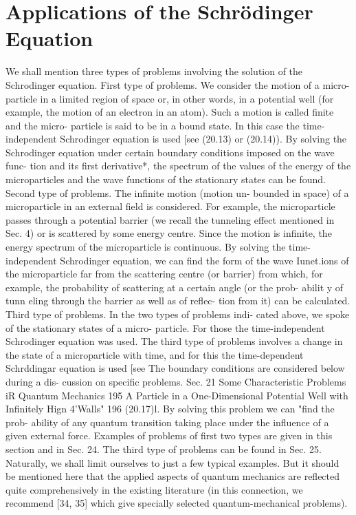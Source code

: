 \documentclass[a4paper,sfsidenotes,colorlinks=true]{tufte-book}
\numberwithin{equation}{section}
\numberwithin{figure}{section}
\begin{document}
{{\section{Applications of the Schr\"odinger Equation}
We shall mention three types of problems involving the solution of the Schrodinger equation. First type of problems. We consider the motion of a micro- particle in a limited region of space or, in other words, in a potential well (for example, the motion of an electron in an atom). Such a motion is called finite and the micro- particle is said to be in a bound state. In this case the time-independent Schrodinger equation is used [see (20.13) or (20.14)). By solving the Schrodinger equation under certain boundary conditions imposed on the wave func- tion and its first derivative*, the spectrum of the values of the energy of the microparticles and the wave functions of the stationary states can be found.
Second type of problems. The infinite motion (motion un- bounded in space) of a microparticle in an external field is considered. For example, the microparticle passes through a potential barrier (we recall the tunneling effect mentioned in Sec. 4) or is scattered by some energy centre. Since the motion is infinite, the energy spectrum of the microparticle is continuous. By solving the time- independent Schrodinger equation, we can find the form of the wave Iunet.ions of the microparticle far from the scattering centre (or barrier) from which, for example, the probability of scattering at a certain angle (or the prob- abilit y of tunn eling through the barrier as well as of reflec- tion from it) can be calculated.
Third type of problems. In the two types of problems indi- cated above, we spoke of the stationary states of a micro- particle. For those the time-independent Schrodinger equation was used. The third type of problems involves a change in the state of a microparticle with time, and for this the time-dependent Schrddingar equation is used [see
 The boundary conditions are considered below during a dis- cussion on specific problems.
Sec. 21
Some Characteristic Problems iR Quantum Mechanics
195
A Particle in a One-Dimensional Potential Well with Infinitely Hign 4'Walls"
196
(20.17)l. By solving this problem we can "find the prob- ability of any quantum transition taking place under the influence of a given external force. Examples of problems of first two types are given in this section and in Sec. 24. The third type of problems can be found in Sec. 25. Naturally, we shall limit ourselves to just a few typical examples. But it should be mentioned here that the applied aspects of quantum mechanics are reflected quite comprehensively in the existing literature (in this connection, we recommend [34, 35] which give specially selected quantum-mechanical problems).
}}
\end{document}
